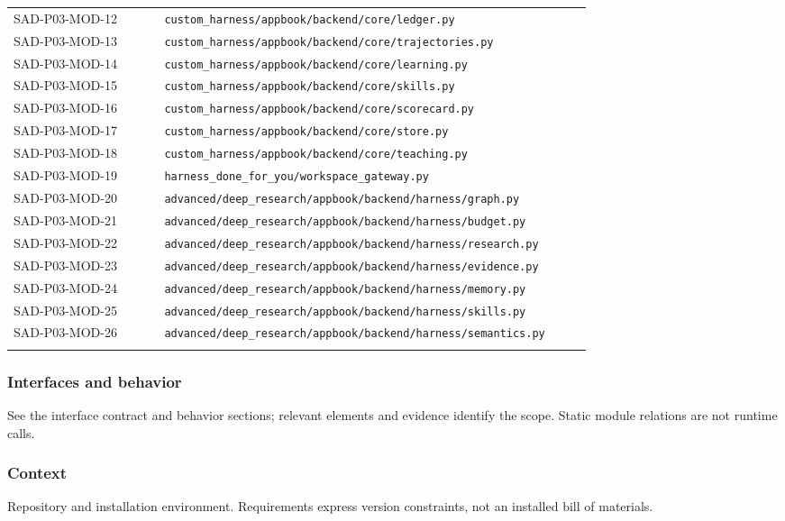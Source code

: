\documentclass[10pt,letterpaper]{article}
\begin{document}
\begin{longtable}{@{}>{\raggedright\arraybackslash}p{0.24\linewidth}>{\raggedright\arraybackslash}p{0.68\linewidth}@{}}
SAD-P03-MOD-12 & \nolinkurl{custom_harness/appbook/backend/core/ledger.py}\\\addlinespace
SAD-P03-MOD-13 & \nolinkurl{custom_harness/appbook/backend/core/trajectories.py}\\\addlinespace
SAD-P03-MOD-14 & \nolinkurl{custom_harness/appbook/backend/core/learning.py}\\\addlinespace
SAD-P03-MOD-15 & \nolinkurl{custom_harness/appbook/backend/core/skills.py}\\\addlinespace
SAD-P03-MOD-16 & \nolinkurl{custom_harness/appbook/backend/core/scorecard.py}\\\addlinespace
SAD-P03-MOD-17 & \nolinkurl{custom_harness/appbook/backend/core/store.py}\\\addlinespace
SAD-P03-MOD-18 & \nolinkurl{custom_harness/appbook/backend/core/teaching.py}\\\addlinespace
SAD-P03-MOD-19 & \nolinkurl{harness_done_for_you/workspace_gateway.py}\\\addlinespace
SAD-P03-MOD-20 & \nolinkurl{advanced/deep_research/appbook/backend/harness/graph.py}\\\addlinespace
SAD-P03-MOD-21 & \nolinkurl{advanced/deep_research/appbook/backend/harness/budget.py}\\\addlinespace
SAD-P03-MOD-22 & \nolinkurl{advanced/deep_research/appbook/backend/harness/research.py}\\\addlinespace
SAD-P03-MOD-23 & \nolinkurl{advanced/deep_research/appbook/backend/harness/evidence.py}\\\addlinespace
SAD-P03-MOD-24 & \nolinkurl{advanced/deep_research/appbook/backend/harness/memory.py}\\\addlinespace
SAD-P03-MOD-25 & \nolinkurl{advanced/deep_research/appbook/backend/harness/skills.py}\\\addlinespace
SAD-P03-MOD-26 & \nolinkurl{advanced/deep_research/appbook/backend/harness/semantics.py}\\\addlinespace
\bottomrule\end{longtable}

\subsubsection{Interfaces and behavior}
See the interface contract and behavior sections; relevant elements and evidence identify the scope. Static module relations are not runtime calls.
\subsubsection{Context}
Repository and installation environment. Requirements express version constraints, not an installed bill of materials.
\end{document}
